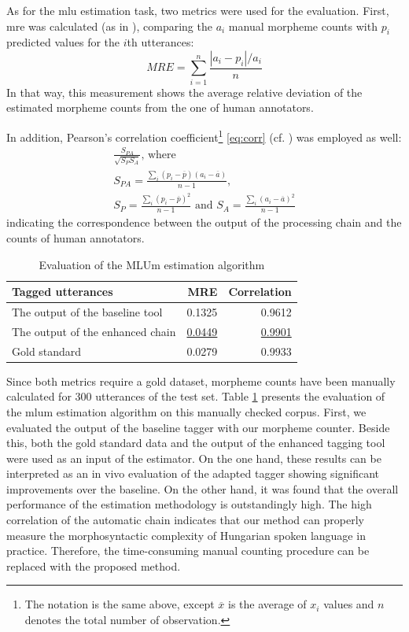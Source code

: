 As for the \acrshort{mlu} estimation task, two metrics were used for the evaluation. 
First, \acrlong{mre} was calculated (as in \cite{Witten2011}), comparing the $a_i$ manual morpheme counts with $p_i$ predicted values for the $i$th utterances:
\begin{equation}
MRE = \sum_{i=1}^n \frac{|a_i-p_i|/a_i}{n}
\end{equation}
In that way, this measurement shows the average relative deviation of the estimated morpheme counts from the one of human annotators. 

In addition, Pearson's correlation coefficient\footnote{The notation is the same above, except $\overline{x}$ is the average of $x_i$ values and $n$ denotes the total number of observation.}
 \eqref{eq:corr} (cf. \cite{Witten2011}) was employed as well:
  \begin{gather}\label{eq:corr}
  \frac{S_{PA}}{\sqrt{S_P S_A}} \text{, where } \\
  S_{PA} = \frac{\sum_i{(p_i-\overline{p})(a_i-\overline{a})}}{n-1} \text{, } \nonumber \\
  S_{P} = \frac{\sum_i{(p_i-\overline{p})^2}}{n-1} \text{ and } S_{A} = \frac{\sum_i{(a_i-\overline{a})^2}}{n-1}  \nonumber
  \end{gather}
  indicating the correspondence between the output of the processing chain and the counts of human annotators.


\begin{table}[H]
\centering
\caption{Evaluation of the MLUm estimation algorithm}
\label{tab:eval_est}
\begin{tabular}{ l r r} 
\hline
Tagged utterances & MRE & Correlation \\
\hline
The output of the baseline tool&  0.1325  &  0.9612 \\
The output of the enhanced chain & \underline{0.0449} & \underline{0.9901} \\
Gold standard &  0.0279 &  0.9933 \\
\hline
\end{tabular}
\end{table}

Since both metrics require a gold dataset, morpheme counts have been manually calculated for 300 utterances of the test set.
Table \ref{tab:eval_est} presents the evaluation of the \acrshort{mlum} estimation algorithm on this manually checked corpus. 
First, we evaluated the output of the baseline tagger with our morpheme counter. 
Beside this, both the gold standard data and the output of the enhanced tagging tool were used as an input of the estimator. %
On the one hand, these results can be interpreted as an in vivo evaluation of the adapted tagger showing significant improvements over the baseline.
On the other hand, it was found that the overall performance of the estimation methodology is outstandingly high.  
The high correlation of the automatic chain indicates that our method can properly measure the morphosyntactic complexity of Hungarian spoken language in practice. 
Therefore, the time-consuming manual counting procedure can be replaced with the proposed method.